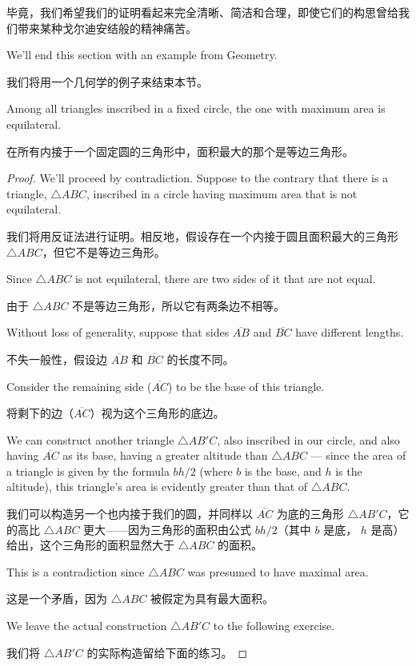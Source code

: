 毕竟，我们希望我们的证明看起来完全清晰、简洁和合理，即使它们的构思曾给我们带来某种戈尔迪安结般的精神痛苦。

We'll end this section with an example from Geometry.

我们将用一个几何学的例子来结束本节。

\begin{thm}
      Among all triangles inscribed in a fixed circle, the one with maximum
      area is equilateral.

      在所有内接于一个固定圆的三角形中，面积最大的那个是等边三角形。
\end{thm}

\begin{proof}
      We'll proceed by contradiction.  Suppose to the contrary that there is a
      triangle, $\triangle ABC$, inscribed in a circle having maximum area that
      is not equilateral.

      我们将用反证法进行证明。相反地，假设存在一个内接于圆且面积最大的三角形 $\triangle ABC$，但它不是等边三角形。

      Since $\triangle ABC$ is not equilateral, there are
      two sides of it that are not equal.

      由于 $\triangle ABC$ 不是等边三角形，所以它有两条边不相等。

      Without loss of generality, suppose that
      sides $\overline{AB}$ and $\overline{BC}$ have different lengths.

      不失一般性，假设边 $\overline{AB}$ 和 $\overline{BC}$ 的长度不同。

      Consider
      the remaining side ($\overline{AC}$) to be the base of this triangle.

      将剩下的边（$\overline{AC}$）视为这个三角形的底边。

      We can construct another triangle $\triangle AB'C$, also inscribed in our circle, and also
      having $\overline{AC}$ as its base, having a greater altitude than
      $\triangle ABC$ --- since the area of a triangle is given by
      the formula $bh/2$ (where $b$ is the base, and $h$ is the altitude),
      this triangle's area is evidently greater than that of $\triangle ABC$.

      我们可以构造另一个也内接于我们的圆，并同样以 $\overline{AC}$ 为底的三角形 $\triangle AB'C$，它的高比 $\triangle ABC$ 更大——因为三角形的面积由公式 $bh/2$（其中 $b$ 是底， $h$ 是高）给出，这个三角形的面积显然大于 $\triangle ABC$ 的面积。

      This is a contradiction since $\triangle ABC$ was presumed to have
      maximal area.

      这是一个矛盾，因为 $\triangle ABC$ 被假定为具有最大面积。

      We leave the actual construction $\triangle AB'C$ to the following exercise.

      我们将 $\triangle AB'C$ 的实际构造留给下面的练习。
\end{proof}

